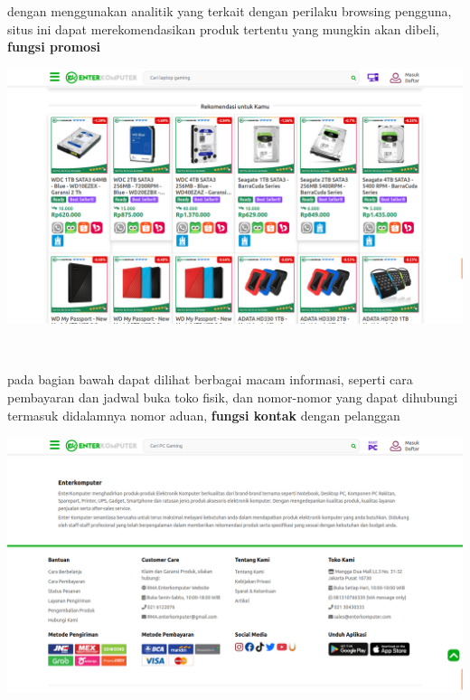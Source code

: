 \documentclass{article}
\begin{document}
\begin{minipage}{0.30\textwidth}
    dengan menggunakan analitik yang terkait dengan perilaku browsing pengguna, 
    situs ini dapat merekomendasikan produk tertentu yang mungkin akan dibeli, \textbf{fungsi promosi}
\end{minipage}
\hspace*{0.04\textwidth}
\begin{minipage}{0.65\textwidth}
    \includegraphics[width=\textwidth]{file-23.png}
\end{minipage}
\\
\begin{minipage}{0.30\textwidth}
    pada bagian bawah dapat dilihat berbagai macam informasi, seperti cara pembayaran dan  jadwal buka toko fisik, dan nomor-nomor yang dapat dihubungi termasuk didalamnya nomor aduan, 
    \textbf{fungsi kontak} dengan pelanggan
\end{minipage}
\hspace*{0.04\textwidth}
\begin{minipage}{0.65\textwidth}
    \includegraphics[width=\textwidth]{file-22.png}
\end{minipage}
\end{document}
